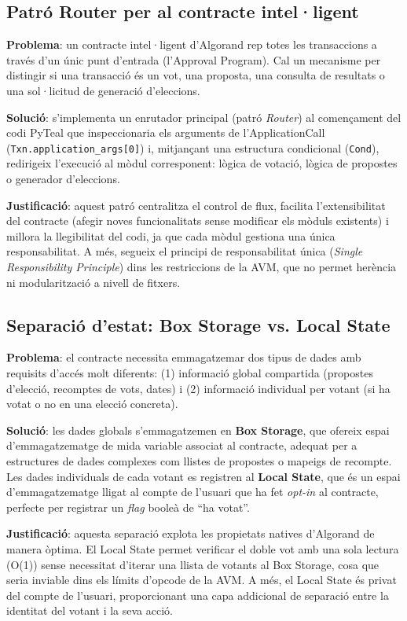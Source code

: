 \subsection{Patró Router per al contracte intel·ligent}
 
\textbf{Problema}: un contracte intel·ligent d'Algorand rep totes les transaccions a través d'un únic punt d'entrada (l'Approval Program). Cal un mecanisme per distingir si una transacció és un vot, una proposta, una consulta de resultats o una sol·licitud de generació d'eleccions.
 
\textbf{Solució}: s'implementa un enrutador principal (patró \textit{Router}) al començament del codi PyTeal que inspeccionaria els arguments de l'ApplicationCall (\texttt{Txn.application\_args[0]}) i, mitjançant una estructura condicional (\texttt{Cond}), redirigeix l'execució al mòdul corresponent: lògica de votació, lògica de propostes o generador d'eleccions.
 
\textbf{Justificació}: aquest patró centralitza el control de flux, facilita l'extensibilitat del contracte (afegir noves funcionalitats sense modificar els mòduls existents) i millora la llegibilitat del codi, ja que cada mòdul gestiona una única responsabilitat. A més, segueix el principi de responsabilitat única (\textit{Single Responsibility Principle}) dins les restriccions de la AVM, que no permet herència ni modularització a nivell de fitxers.
 
\subsection{Separació d'estat: Box Storage vs. Local State}
 
\textbf{Problema}: el contracte necessita emmagatzemar dos tipus de dades amb requisits d'accés molt diferents: (1) informació global compartida (propostes d'elecció, recomptes de vots, dates) i (2) informació individual per votant (si ha votat o no en una elecció concreta).
 
\textbf{Solució}: les dades globals s'emmagatzemen en \textbf{Box Storage}, que ofereix espai d'emmagatzematge de mida variable associat al contracte, adequat per a estructures de dades complexes com llistes de propostes o mapeigs de recompte. Les dades individuals de cada votant es registren al \textbf{Local State}, que és un espai d'emmagatzematge lligat al compte de l'usuari que ha fet \textit{opt-in} al contracte, perfecte per registrar un \textit{flag} booleà de ``ha votat''.
 
\textbf{Justificació}: aquesta separació explota les propietats natives d'Algorand de manera òptima. El Local State permet verificar el doble vot amb una sola lectura (O(1)) sense necessitat d'iterar una llista de votants al Box Storage, cosa que seria inviable dins els límits d'opcode de la AVM. A més, el Local State és privat del compte de l'usuari, proporcionant una capa addicional de separació entre la identitat del votant i la seva acció.
 
